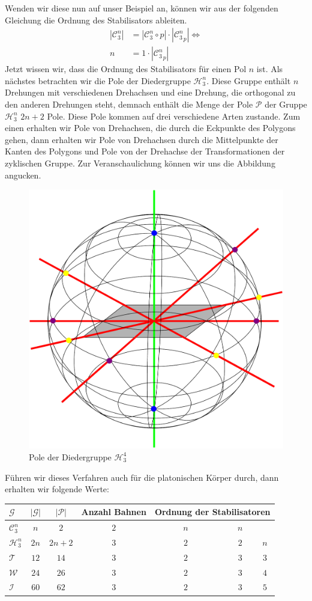 Wenden wir diese nun auf unser Beispiel an, können wir aus der folgenden Gleichung die Ordnung des Stabilisators ableiten.
\begin{align*}
	 |\mathcal{C}_3^n| &= |\mathcal{C}_3^n \circ p| \cdot |{\mathcal{C}_3^n}_p| \Leftrightarrow\\
	 n &= 1 \cdot |{\mathcal{C}_3^n}_p|
\end{align*}
Jetzt wissen wir, dass die Ordnung des Stabilisators für einen Pol $n$ ist. Als nächstes betrachten wir die Pole der Diedergruppe $\mathcal{H}_3^n$. Diese Gruppe enthält $n$ Drehungen mit verschiedenen Drehachsen und eine Drehung, die orthogonal zu den anderen Drehungen steht, demnach enthält die Menge der Pole $\mathcal{P}$ der Gruppe $\mathcal{H}_3^n$ $2n+2$ Pole. Diese Pole kommen auf drei verschiedene Arten zustande. Zum einen erhalten wir Pole von Drehachsen, die durch die Eckpunkte des Polygons gehen, dann erhalten wir Pole von Drehachsen durch die Mittelpunkte der Kanten des Polygons und Pole von der Drehachse der Transformationen der zyklischen Gruppe. Zur Veranschaulichung können wir uns die Abbildung angucken.
\begin{figure}[H]
\centering
\includegraphics[width=0.5\linewidth]{grafiken/pole_diedergruppe}
\caption{Pole der Diedergruppe $\mathcal{H}_3^4$}
\label{fig:pole_diedergruppe}
\end{figure}
Führen wir dieses Verfahren auch für die platonischen Körper durch, dann erhalten wir folgende Werte:
\begin{center}
	\begin{tabular}{l|cccccc}
		$\mathcal{G}$ & $|\mathcal{G}|$ & $|\mathcal{P}|$ & Anzahl Bahnen & \multicolumn{3}{c}{Ordnung der Stabilisatoren}\\
		\hline
		$\mathcal{C}^n_3$ & $n$ & $2$ & $2$ & \ \ \ \ \ $n$ & \ \ \ \ \ \ $n$ & \\
		$\mathcal{H}^n_3$ & $2n$ & $2n + 2$ & $3$ & \ \ \ \ \ $2$ & \ \ \ \ \ \ $2$ & $n$\\
		$\mathcal{T}$ & $12$ & $14$ & $3$ & \ \ \ \ \ $2$ & \ \ \ \ \ \ $3$ & $3$\\
		$\mathcal{W}$ & $24$ & $26$ & $3$ & \ \ \ \ \  $2$ & \ \ \ \ \ \ $3$ & $4$\\
		$\mathcal{I}$ & $60$ & $62$ & $3$ & \ \ \ \ \ $2$ & \ \ \ \ \ \ $3$ & $5$
	\end{tabular}
\end{center}
